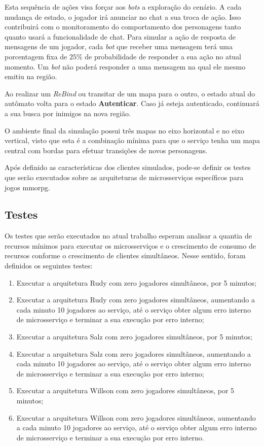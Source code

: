 Esta sequência de ações visa forçar aos \textit{bots} a exploração do cenário.
%
A cada mudança de estado, o jogador irá anunciar no chat a sua troca de ação.
%
Isso contribuirá com o monitoramento do comportamento dos personagens tanto quanto usará a funcionalidade de chat.
%
Para simular a ação de resposta de mensagens de um jogador, cada \textit{bot} que receber uma mensagem terá uma porcentagem fixa de $25\%$ de probabilidade de responder a sua ação no atual momento.
%
Um \textit{bot} não poderá responder a uma mensagem na qual ele mesmo emitiu na região.


Ao realizar um \textit{ReBind} ou transitar de um mapa para o outro, o estado atual do autômato volta para o estado \textbf{Autenticar}.
%
Caso já esteja autenticado, continuará a sua busca por inimigos na nova região.

O ambiente final da simulação possui três mapas no eixo horizontal e no eixo vertical, visto que esta é a combinação mínima para que o serviço tenha um mapa central com bordas para efetuar transições de novos personagens.

Após definido as características dos clientes simulados, pode-se definir os testes que serão executados sobre as arquiteturas de microsserviços específicos para jogos \ac{mmorpg}.

\subsection{Testes}

Os testes que serão executados no atual trabalho esperam analisar a quantia de recursos mínimos para executar os microsserviços e o crescimento de consumo de recursos conforme o crescimento de clientes simultâneos.
%
Nesse sentido, foram definidos os seguintes testes:

\begin{enumerate}
  \item Executar a arquitetura Rudy com zero jogadores simultâneos, por 5 minutos;
  \item Executar a arquitetura Rudy com zero jogadores simultâneos, aumentando a cada minuto 10 jogadores ao serviço, até o serviço obter algum erro interno de microsserviço e terminar a sua execução por erro interno;
  \item Executar a arquitetura Salz com zero jogadores simultâneos, por 5 minutos;
  \item Executar a arquitetura Salz com zero jogadores simultâneos, aumentando a cada minuto 10 jogadores ao serviço, até o serviço obter algum erro interno de microsserviço e terminar a sua execução por erro interno;
  \item Executar a arquitetura Willson com zero jogadores simultâneos, por 5 minutos;
  \item Executar a arquitetura Willson com zero jogadores simultâneos, aumentando a cada minuto 10 jogadores ao serviço, até o serviço obter algum erro interno de microsserviço e terminar a sua execução por erro interno.
\end{enumerate}

